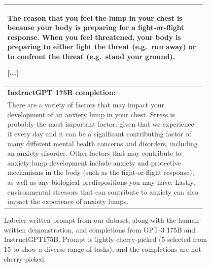 \begin{figure}[hp]
\begin{tabular}{p{0.95\linewidth}}
The reason that you feel the lump in your chest is because your body is preparing for a fight-or-flight response. When you feel threatened, your body is preparing to either fight the threat (e.g.\ run away) or to confront the threat (e.g.\ stand your ground).

[...]

\\ \midrule 
\textbf{InstructGPT 175B completion:} \\
There are a variety of factors that may impact your development of an anxiety lump in your chest. Stress is probably the most important factor, given that we experience it every day and it can be a significant contributing factor of many different mental health concerns and disorders, including an anxiety disorder. Other factors that may contribute to anxiety lump development include anxiety and protective mechanisms in the body (such as the fight-or-flight response), as well as any biological predispositions you may have. Lastly, environmental stressors that can contribute to anxiety can also impact the experience of anxiety lumps.
\\ \bottomrule
    \end{tabular}
    \caption{Labeler-written prompt from our dataset, along with the human-written demonstration, and completions from GPT-3 175B and InstructGPT175B. Prompt is lightly cherry-picked (5 selected from 15 to show a diverse range of tasks), and the completions are not cherry-picked.}
    \label{fig:qual_labeler_5}
\end{figure}



\documentclass{article}

\usepackage[final]{neurips_2021}

\usepackage[utf8]{inputenc} %
\usepackage[T1]{fontenc}    %
\usepackage{hyperref}       %
\usepackage{url}            %
\usepackage{booktabs}       %
\usepackage{amsfonts}       %
\usepackage{nicefrac}       %
\usepackage{comment}       
\usepackage{microtype}      %
\usepackage{xcolor}         %
\usepackage{graphicx}
\usepackage{minitoc}
\usepackage{subcaption}
\usepackage{fancyvrb}
\usepackage{pythonhighlight}
\usepackage{pdfpages}
\usepackage{subcaption}
\usepackage{multirow}
\usepackage{tabularx}
\usepackage{amsmath}
\usepackage{longtable}


